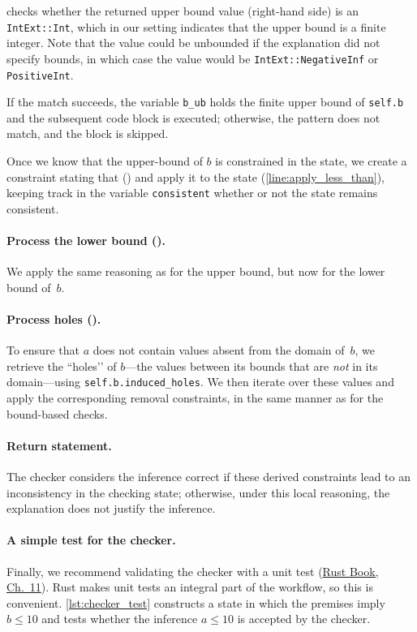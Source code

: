 \documentclass{article}
\begin{document}
checks whether the returned upper bound value (right-hand side) is an \texttt{IntExt::Int}, which in our setting indicates that the upper bound is a finite integer. Note that the value could be unbounded if the explanation did not specify bounds, in which case the value would be \texttt{IntExt::NegativeInf} or \texttt{PositiveInt}.

If the match succeeds, the variable \texttt{b\_ub} holds the finite upper bound of \texttt{self.b} and the subsequent code block is executed; otherwise, the pattern does not match, and the block is skipped.

Once we know that the upper-bound of $b$ is constrained in the state, we create a constraint stating that  () and apply it to the state (\autoref{line:apply_less_than}), keeping track in the variable \texttt{consistent} whether or not the state remains consistent.

\paragraph{Process the lower bound ().}
We apply the same reasoning as for the upper bound, but now for the lower bound of~$b$.

\paragraph{Process holes ().}
To ensure that $a$ does not contain values absent from the domain of~$b$, we
retrieve the “holes’’ of $b$—the values between its bounds that are \emph{not}
in its domain—using \texttt{self.b.induced_holes}. We then iterate
over these values and apply the corresponding removal constraints, in the same
manner as for the bound-based checks.

\paragraph{Return statement.}
The checker considers the inference correct if these derived
constraints lead to an inconsistency in the checking state; otherwise, under
this local reasoning, the explanation does not justify the inference.

\paragraph{A simple test for the checker.}
Finally, we recommend validating the checker with a unit test (\href{https://doc.rust-lang.org/book/ch11-00-testing.html}{Rust Book, Ch.~11}). Rust makes unit tests an integral part of the workflow, so this is convenient.
\autoref{lst:checker_test} constructs a state in which the premises imply $b \leq 10$ and tests whether the inference $a \leq 10$ is accepted by the checker.
\end{document}

